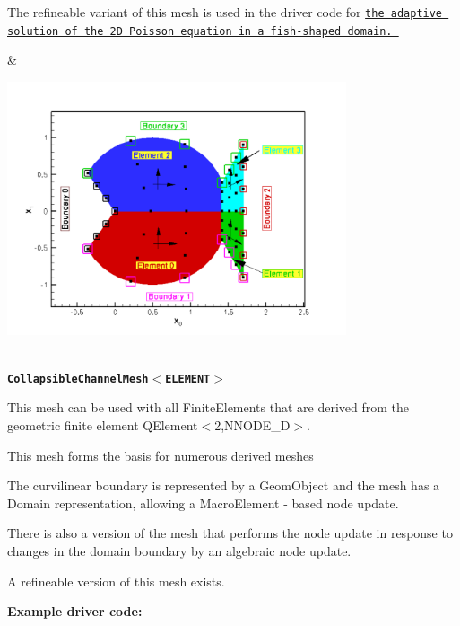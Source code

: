 \begin{center}
\begin{longtabu}
\begin{DoxyItemize}
\item The refineable variant of this mesh is used in the driver code for \href{../../../poisson/fish_poisson/html/index.html}{\tt the adaptive solution of the 2D Poisson equation in a fish-\/shaped domain. }
\end{DoxyItemize}& 
\begin{DoxyImageNoCaption}
  \mbox{\includegraphics[width=0.75\textwidth]{fish_mesh}}
\end{DoxyImageNoCaption}
   \\
\label{_collapsible_channel}%
 \href{classoomph_1_1CollapsibleChannelMesh.html}{\tt {\bfseries  Collapsible\+Channel\+Mesh$<$\+E\+L\+E\+M\+E\+N\+T$>$ }} ~\newline
~\newline

\begin{DoxyItemize}
\item This mesh can be used with all {\ttfamily Finite\+Elements} that are derived from the geometric finite element {\ttfamily Q\+Element$<$2,\+N\+N\+O\+D\+E\+\_\+D$>$}.
\item This mesh forms the basis for numerous derived meshes
\item The curvilinear boundary is represented by a {\ttfamily Geom\+Object} and the mesh has a {\ttfamily Domain} representation, allowing a {\ttfamily Macro\+Element} -\/ based node update.
\item There is also a version of the mesh that performs the node update in response to changes in the domain boundary by an algebraic node update.
\item A refineable version of this mesh exists.
\end{DoxyItemize}{\bfseries Example driver code\+:} ~\newline


\end{longtabu}
\end{center}
